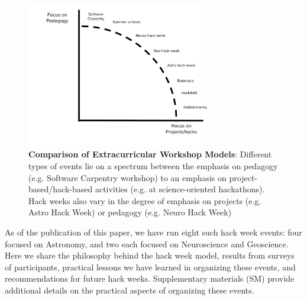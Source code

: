 
\begin{figure}
\begin{center}
\includegraphics[width=8cm]{NewHackSpectrum.pdf}
\caption{{\bf Comparison of Extracurricular Workshop Models}: Different types of events lie on a spectrum between the emphasis on pedagogy (e.g. Software Carpentry workshop) to an emphasis on project-based/hack-based activities (e.g. at science-oriented hackathons). Hack weeks also vary in the degree of emphasis on projects (e.g. Astro Hack Week) or pedagogy (e.g. Neuro Hack Week)}
\label{fig:hackspectrum}
\end{center}
\end{figure}

As of the publication of this paper, we have run eight such hack week events: four focused on Astronomy, and two each focused on Neuroscience and Geoscience.
Here we share the philosophy behind the hack week model, results from surveys of participants, practical lessons we have learned in organizing these events, and recommendations for future hack weeks. Supplementary materials (SM) provide additional details on the practical aspects of organizing these events.
